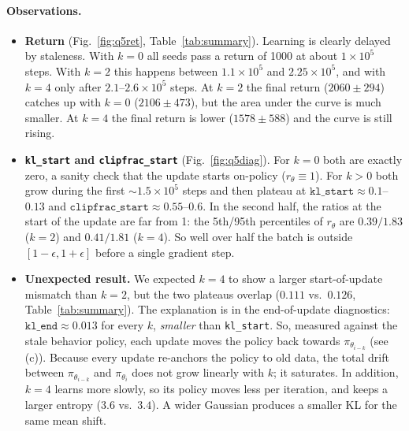 \documentclass[11pt]{article}
\newcommand{\code}[1]{\texttt{#1}}
\begin{document}
\paragraph{Observations.}
\begin{itemize}[leftmargin=*]
  \item \textbf{Return} (Fig.~\ref{fig:q5ret}, Table~\ref{tab:summary}). Learning is clearly delayed by staleness.
        With $k=0$ all seeds pass a return of 1000 at about $1\times10^5$ steps. With $k=2$ this happens
        between $1.1\times10^5$ and $2.25\times10^5$, and with $k=4$ only after $2.1$--$2.6\times10^5$ steps. At $k=2$ the
        final return ($2060\pm294$) catches up with $k=0$ ($2106\pm473$), but the area under the curve is much
        smaller. At $k=4$ the final return is lower ($1578\pm588$) and the curve is still rising.

  \item \textbf{\code{kl\_start} and \code{clipfrac\_start}} (Fig.~\ref{fig:q5diag}). For $k=0$ both are exactly zero,
        a sanity check that the update starts on-policy ($r_\theta\equiv1$). For $k>0$ both grow during the
        first $\sim1.5\times10^5$ steps and then plateau at $\code{kl\_start}\approx0.1$--$0.13$ and
        $\code{clipfrac\_start}\approx0.55$--$0.6$. In the second half, the ratios at the start of the
        update are far from 1: the 5th/95th percentiles of $r_\theta$ are $0.39/1.83$ ($k=2$) and
        $0.41/1.81$ ($k=4$). So well over half the batch is outside $[1-\epsilon,1+\epsilon]$ before a
        single gradient step.

  \item \textbf{Unexpected result.} We expected $k=4$ to show a larger start-of-update mismatch than
        $k=2$, but the two plateaus overlap ($0.111$ vs.\ $0.126$, Table~\ref{tab:summary}). The
        explanation is in the end-of-update diagnostics: $\code{kl\_end}\approx0.013$ for every $k$,
        \emph{smaller} than \code{kl\_start}. So, measured against the stale behavior policy, each update
        moves the policy back towards $\pi_{\theta_{i-k}}$ (see (c)). Because every update re-anchors the
        policy to old data, the total drift between $\pi_{\theta_{i-k}}$ and $\pi_{\theta_i}$
        does not grow linearly with $k$; it saturates. In addition, $k=4$ learns
        more slowly, so its policy moves less per iteration, and keeps a larger entropy ($3.6$ vs.\ $3.4$). A wider
        Gaussian produces a smaller KL for the same mean shift.
\end{itemize}
\end{document}
